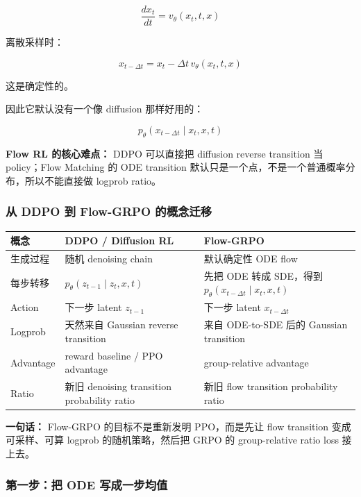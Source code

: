 \[
\frac{dx_t}{dt}
=
v_\theta(x_t,t,x)
\]

离散采样时：

\[
x_{t-\Delta t}
=
x_t-\Delta t\,v_\theta(x_t,t,x)
\]

这是确定性的。

因此它默认没有一个像 diffusion 那样好用的：

\[
p_\theta(x_{t-\Delta t}\mid x_t,x,t)
\]

\begin{warnbox}
\textbf{Flow RL 的核心难点：} DDPO 可以直接把 diffusion reverse transition 当 policy；Flow Matching 的 ODE transition 默认只是一个点，不是一个普通概率分布，所以不能直接做 logprob ratio。
\end{warnbox}

\subsubsection{从 DDPO 到 Flow-GRPO 的概念迁移}

\begin{center}
{\small
\begin{tabular}{p{3cm}p{4.8cm}p{4.8cm}}
\hline
\textbf{概念} & \textbf{DDPO / Diffusion RL} & \textbf{Flow-GRPO} \\
\hline
生成过程
&
随机 denoising chain
&
默认确定性 ODE flow
\\
每步转移
&
$p_\theta(z_{t-1}\mid z_t,x,t)$
&
先把 ODE 转成 SDE，得到 $p_\theta(x_{t-\Delta t}\mid x_t,x,t)$
\\
Action
&
下一步 latent $z_{t-1}$
&
下一步 latent $x_{t-\Delta t}$
\\
Logprob
&
天然来自 Gaussian reverse transition
&
来自 ODE-to-SDE 后的 Gaussian transition
\\
Advantage
&
reward baseline / PPO advantage
&
group-relative advantage
\\
Ratio
&
新旧 denoising transition probability ratio
&
新旧 flow transition probability ratio
\\
\hline
\end{tabular}
}
\end{center}

\begin{summarybox}
\textbf{一句话：} Flow-GRPO 的目标不是重新发明 PPO，而是先让 flow transition 变成可采样、可算 logprob 的随机策略，然后把 GRPO 的 group-relative ratio loss 接上去。
\end{summarybox}

\subsubsection{第一步：把 ODE 写成一步均值}


